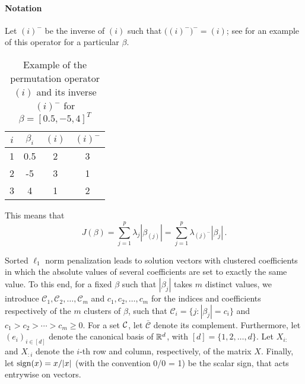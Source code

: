 \paragraph{Notation}\label{sec:notation}

Let \((i)^{-}\) be the inverse of \((i)\) such that
\(\big((i)^-\big)^- = (i)\); see  for an
example of this operator for a particular \(\beta\).
\begin{table}[bt]
  \centering
  \caption{Example of the permutation operator \((i)\) and its inverse
    \((i)^-\) for $\beta = [0.5, -5, 4]^T$}
    \label{tab:permutation-example}
  \begin{tabular}{cS[table-format=-1.1]cc}
    \toprule
    \(i\) & {\(\beta_i\)} & \((i)\) & \((i)^-\) \\
         & 0.5         & 2       & 3         \\
    2     & -5          & 3       & 1         \\
    3     & 4           & 1       & 2         \\
    \bottomrule
  \end{tabular}
\end{table}
This means that
\[
  J(\beta) = \sum_{j=1}^p \lambda_j |\beta_{(j)}|
  = \sum_{j=1}^p \lambda_{(j)^-}|\beta_j| \,.
\]

Sorted $\ell_1$ norm penalization leads to solution vectors with clustered coefficients in which the absolute values of several coefficients are set to exactly the same value.
To this end, for a fixed $\beta$ such that $|\beta_j|$ takes $m$ distinct values, we introduce \(\mathcal{C}_1, \mathcal{C}_2 , \dots, \mathcal{C}_m\) and \(c_1,
c_2, \dots, c_m\) for the indices and coefficients respectively of the \(m\)
clusters of $\beta$, such that
$\mathcal{C}_i = \{j : |\beta_j| = c_i\}$ and $c_1 > c_2 > \cdots > c_m \geq 0.$
For a set $\mathcal{C}$, let \(\bar{\mathcal{C}}\) denote its complement.
Furthermore, let $(e_i)_{i \in [d]}$ denote the canonical basis of $\mathbb{R}^d$, with \([d] = \{1,2,\dots,d\}\).
Let $X_{i:}$ and $X_{:i}$ denote the $i$-th row and column, respectively, of the matrix $X$.
Finally, let $\operatorname{sign}(x) = x / |x|$ (with the convention 0/0 = 1) be the scalar sign, that acts entrywise on vectors.


